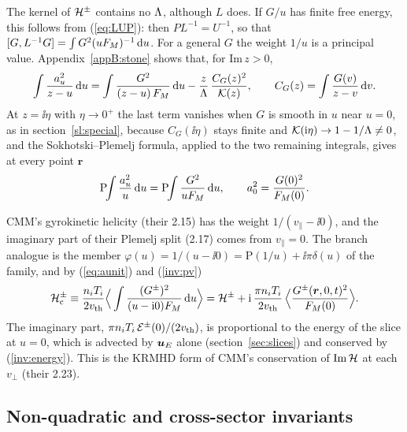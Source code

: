 The kernel of $\mathcal H^\pm$ contains no $\Lambda$, although $L$ does. If $G/u$ has finite free energy, this follows from (\ref{eq:LUP}): then $PL^{-1}=U^{-1}$, so that $[G,L^{-1}G]=\int G^2(uF_M)^{-1}\,\mathrm{d} u$. For a general $G$ the weight $1/u$ is a principal value. Appendix~\ref{appB:stone} shows that, for $\mathrm{Im}\,z>0$,
\begin{equation}\label{inv:stieltjes}
  \int\frac{a_u^2}{z-u}\,\mathrm{d} u=\int\frac{G^2}{(z-u)\,F_M}\,\mathrm{d} u-\frac{z}{\Lambda}\,\frac{C_G(z)^2}{\mathcal K(z)},\qquad C_G(z)=\int\frac{G(v)}{z-v}\,\mathrm{d} v .
\end{equation}
At $z=\ii\eta$ with $\eta\to0^+$ the last term vanishes when $G$ is smooth in $u$ near $u=0$, as in section~\ref{sl:special}, because $C_G(\ii\eta)$ stays finite and $\mathcal K(\mathrm{i}\eta)\to1-1/\Lambda\neq0$, and the Sokhotski--Plemelj formula, applied to the two remaining integrals, gives at every point $\boldsymbol r$
\begin{equation}\label{inv:pv}
  \mathrm{P}\!\!\int\frac{a_u^2}{u}\,\mathrm{d} u=\mathrm{P}\!\!\int\frac{G^2}{uF_M}\,\mathrm{d} u,\qquad a_0^2=\frac{G(0)^2}{F_M(0)} .
\end{equation}

CMM's gyrokinetic helicity (their 2.15) has the weight $1/(v_\parallel-\ii0)$, and the imaginary part of their Plemelj split (2.17) comes from $v_\parallel=0$. The branch analogue is the member $\varphi(u)=1/(u-\ii0)=\mathrm P(1/u)+\ii\pi\delta(u)$ of the family, and by (\ref{eq:aunit}) and (\ref{inv:pv})
\begin{equation}\label{eq:Hcomplex}
  \mathcal H^\pm_{\mathrm c}\equiv\frac{n_iT_i}{2v_{\mathrm{th}}}\Big\langle\int\frac{(G^\pm)^2}{(u-\mathrm{i}0)F_M}\,\mathrm{d} u\Big\rangle
  =\mathcal H^\pm+\mathrm{i}\,\frac{\pi n_iT_i}{2v_{\mathrm{th}}}\,\Big\langle\frac{G^\pm(\boldsymbol r,0,t)^2}{F_M(0)}\Big\rangle .
\end{equation}
The imaginary part, $\pi n_iT_i\,\mathcal E^\pm(0)/(2v_{\mathrm{th}})$, is proportional to the energy of the slice at $u=0$, which is advected by $\boldsymbol u_E$ alone (section~\ref{sec:slices}) and conserved by (\ref{inv:energy}). This is the KRMHD form of CMM's conservation of $\mathrm{Im}\,\mathcal H$ at each $v_\perp$ (their 2.23).

\subsection{Non-quadratic and cross-sector invariants}\label{inv:casimirs}

